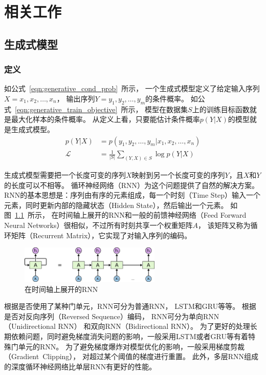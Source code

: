 \chapter{相关工作}\label{ch:related_work}
\section{生成式模型}\label{sec:generative_model}

\subsection{定义}\label{subsec:definition}
如公式~\ref{eqn:generative_cond_prob}~所示，
一个生成式模型定义了给定输入序列$X = x_1, x_2, \dots, x_n$，
输出序列$Y = y_1, y_2, \dots, y_m$的条件概率。
如公式~\ref{eqn:generative_train_objective}~所示，
模型在数据集$S$上的训练目标函数就是最大化样本的条件概率。
从定义上看，只要能估计条件概率$p(Y|X)$的模型就是生成式模型。
\begin{align}
    p(Y|X) &= p(y_1, y_2, \dots, y_m|x_1, x_2, \dots, x_n)
    \label{eqn:generative_cond_prob} \\
    \mathcal{L} &= \frac{1}{|S|} \sum_{(Y, X) \in S} \log p(Y|X)
    \label{eqn:generative_train_objective}
\end{align}

生成式模型需要把一个长度可变的序列$X$映射到另一个长度可变的序列$Y$，且$X$和$Y$的长度可以不相等。
循环神经网络（RNN）为这个问题提供了自然的解决方案。
RNN的基本思想是：序列由有序的元素组成，每一个时刻（Time Step）输入一个元素，同时更新内部的隐藏状态（Hidden State），然后输出一个元素。
如图~\ref{fig:RNN_unrolled}~所示，
在时间轴上展开的RNN和一般的前馈神经网络（Feed Forward Neural Networks）很相似，不过所有时刻共享一个权重矩阵$A$，
该矩阵又称为循环矩阵（Recurrent Matrix），它实现了对输入序列的编码。
\begin{figure}[H]
    \centering
    \includegraphics[width=0.6\textwidth]{figure/RNN-unrolled.png}
    \caption{在时间轴上展开的RNN}
    \label{fig:RNN_unrolled}
\end{figure}

根据是否使用了某种门单元，RNN可分为普通RNN，
LSTM和GRU等等。
根据是否对反向序列（Reversed Sequence）编码，
RNN可分为单向RNN（Unidirectional RNN）
和双向RNN（Bidirectional RNN）。
为了更好的处理长期依赖问题，同时避免梯度消失问题的影响，一般采用LSTM或者GRU等有着特殊门单元的RNN。
为了避免梯度爆炸对模型优化的影响，一般采用梯度剪裁（Gradient~Clipping），
对超过某个阈值的梯度进行重置。
此外，多层RNN组成的深度循环神经网络比单层RNN有更好的性能。

